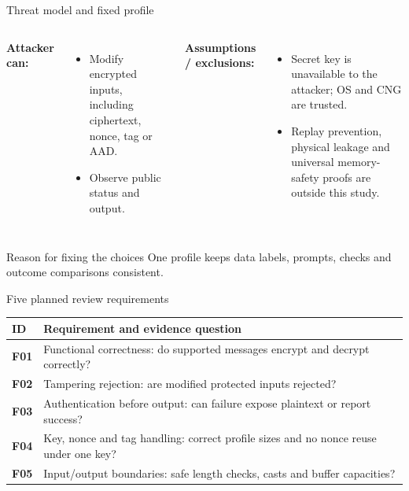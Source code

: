 \documentclass[aspectratio=169,10pt]{beamer}
\begin{document}
\begin{frame}{Threat model and fixed profile}
\begin{columns}[T]
\textbf{Attacker can:}
\begin{itemize}
\item Modify encrypted inputs, including ciphertext, nonce, tag or AAD.
\item Observe public status and output.
\end{itemize}
\textbf{Assumptions / exclusions:}
\begin{itemize}
\item Secret key is unavailable to the attacker; OS and CNG are trusted.
\item Replay prevention, physical leakage and universal memory-safety proofs are outside this study.
\end{itemize}
\end{columns}
\vspace{0.4em}
\begin{block}{Reason for fixing the choices}
One profile keeps data labels, prompts, checks and outcome comparisons consistent.
\end{block}
\end{frame}

\begin{frame}{Five planned review requirements}
\small
\begin{tabularx}{\textwidth}{>{\bfseries}p{1.15cm}X}
\toprule
ID & Requirement and evidence question \\
\midrule
F01 & Functional correctness: do supported messages encrypt and decrypt correctly? \\
F02 & Tampering rejection: are modified protected inputs rejected? \\
F03 & Authentication before output: can failure expose plaintext or report success? \\
F04 & Key, nonce and tag handling: correct profile sizes and no nonce reuse under one key? \\
F05 & Input/output boundaries: safe length checks, casts and buffer capacities? \\
\bottomrule
\end{tabularx}
\end{frame}
\end{document}
